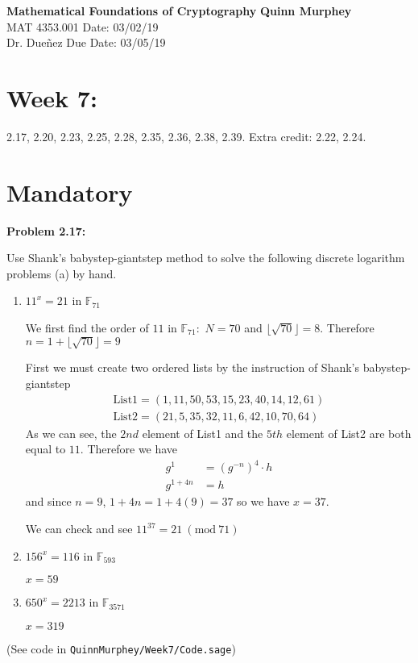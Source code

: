 \documentclass[a4paper, 11pt]{article}
\newcommand{\Mod}[1]{\ (\mathrm{mod}\ #1)}
\begin{document}
\noindent
\large\textbf{Mathematical Foundations of Cryptography} \hfill \textbf{Quinn Murphey} \\
\normalsize MAT 4353.001 \hfill Date: 03/02/19 \\
Dr. Dueñez \hfill Due Date: 03/05/19 \\
\noindent\makebox[\linewidth]{\rule{\paperwidth}{0.4pt}}
\section*{Week 7:}
    2.17, 2.20, 2.23, 2.25, 2.28, 2.35, 2.36, 2.38, 2.39.  Extra credit: 2.22, 2.24.
    
\section*{Mandatory}

\noindent\textbf{Problem 2.17:}

    Use Shank's babystep-giantstep method to solve the following discrete logarithm problems (a) by hand.
    
    \begin{enumerate}[label=(\alph*)]
        \item $11^x = 21$ in $\mathbb{F}_{71}$
        
        We first find the order of $11$ in $\mathbb{F}_{71}:$ $N=70$ and $\lfloor\sqrt{70}\rfloor = 8$. Therefore $n=1+\lfloor\sqrt{70}\rfloor = 9$
        
        First we must create two ordered lists by the instruction of Shank's babystep-giantstep
        \begin{align*}
            \text{List1} = (1, 11, 50, 53, 15, 23, 40, 14, 12, 61)\\
            \text{List2} = (21, 5, 35, 32, 11, 6, 42, 10, 70, 64)
        \end{align*}
        As we can see, the $2nd$ element of List1 and the $5th$ element of List2 are both equal to $11$. Therefore we have
        \begin{align*}
            g^1 &= (g^{-n})^4\cdot h\\
            g^{1+4n} &= h
        \end{align*}
        and since $n=9$, $1+4n=1+4(9)=37$ so we have $x=37$. 
        
        We can check and see $11^{37}=21 \Mod{71}$
        \item $156^x = 116$ in $\mathbb{F}_{593}$
        
        $x = 59$
        \item $650^x = 2213$ in $\mathbb{F}_{3571}$
        
        $x = 319$
    \end{enumerate}
    (See code in \texttt{QuinnMurphey/Week7/Code.sage})
    
\end{document}
